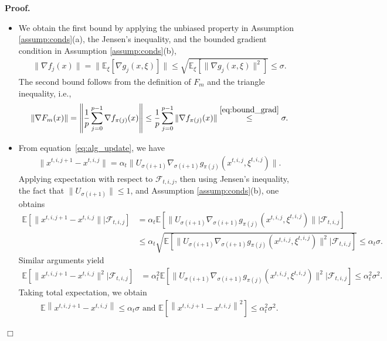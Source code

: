 \documentclass[11pt,a4paper]{article}
\numberwithin{equation}{section}%
\newenvironment{proof}[1][Proof]{\noindent \textbf{#1.} }{\hfill$\Box$\par\medskip}
\renewcommand{\(}{\left (}
\renewcommand{\)}{\right )}
\newcommand{\Fm}{F_m}
\begin{document}
\begin{proof} 
\begin{itemize}
\item[(a)] We obtain the first bound by applying the unbiased property in Assumption \ref{assump:conds}(a), the Jensen's inequality, and the bounded gradient condition in Assumption \ref{assump:conds}(b),
\begin{align}\label{eq:bound_grad}
    \|\nabla f_j(x)\| =  \|\mathbb{E}_{\xi} \left[\nabla g_j(x,\xi)\right]\| \leq \sqrt{ \mathbb{E}_{\xi} \left[\|\nabla g_j(x,\xi)\|^2\right]} \leq \sigma.
\end{align}
The second bound follows from the definition of $\Fm$ and the triangle inequality, i.e.,
\begin{align*}
    \|\nabla \Fm(x)\| =  \left\|\frac{1}{p}\sum_{j=0}^{p-1}\nabla f_{\pi(j)} (x)\right\| \leq \frac{1}{p}\sum_{j=0}^{p-1}\|\nabla f_{\pi(j)} (x)\| \overset{\eqref{eq:bound_grad}}{\leq} \sigma.
\end{align*}
\item[(b)] 
From equation~\eqref{eq:alg_update}, we have 
\begin{align*}
    \|x^{t,i,j+1} - x^{t,i,j}\| = \alpha_t \| U_{\sigma(i+1)} \nabla_{\sigma(i+1)} g_{\pi(j)} (x^{t,i,j}, \xi^{t,i,j})\|.
\end{align*}
Applying expectation with respect to $\mathcal{F}_{t,i,j}$, then using Jensen's inequality, the fact that $\| U_{\sigma(i+1)}\| \leq 1$, and Assumption \ref{assump:conds}(b), one obtains 
\begin{align*}
    \mathbb{E} [\|x^{t,i,j+1} - x^{t,i,j}\|  | \mathcal{F}_{t,i,j}]&= \alpha_t  \mathbb{E} [\| U_{\sigma(i+1)} \nabla_{\sigma(i+1)} g_{\pi(j)} (x^{t,i,j}, \xi^{t,i,j})\|| \mathcal{F}_{t,i,j}]\\
    &\leq \alpha_t  \sqrt{\mathbb{E} [\| U_{\sigma(i+1)} \nabla_{\sigma(i+1)} g_{\pi(j)} (x^{t,i,j}, \xi^{t,i,j})\|^2| \mathcal{F}_{t,i,j}]} \leq \alpha_t \sigma.
\end{align*}
Similar arguments yield
\begin{align*}
    \mathbb{E} [\|x^{t,i,j+1} - x^{t,i,j}\|^2  | \mathcal{F}_{t,i,j}]&= \alpha_t^2  \mathbb{E} [\| U_{\sigma(i+1)} \nabla_{\sigma(i+1)} g_{\pi(j)} (x^{t,i,j}, \xi^{t,i,j})\|^2| \mathcal{F}_{t,i,j}]\leq \alpha_t^2 \sigma^2.
\end{align*}
Taking total expectation, we obtain
\begin{align*}
    \mathbb{E} \left\|x^{t,i,j+1}-x^{t,i,j}\right\| \leq \alpha_t \sigma \text{ and }
    \mathbb{E} \left[\left\|x^{t,i,j+1}-x^{t,i,j}\right\|^2\right] \leq \alpha_t^2 \sigma^2.
\end{align*}
\end{itemize} 
\end{proof}
\end{document}
